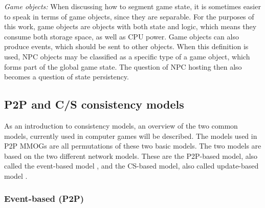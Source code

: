 \documentclass[10pt,a4paper,journal,cspaper,compsoc]{IEEEtran}
\begin{document}
\emph{Game objects:} When discussing how to segment game state, it is sometimes easier to speak in terms of game objects, since they are
    separable. For the purposes of this work, game objects are objects with both state and logic, which means they consume both storage
    space, as well as CPU power. Game objects can also produce events, which should be sent to other objects. When this definition is used,
    NPC objects may be classified as a specific type of a game object, which forms part of the global game state. The question of NPC hosting
    then also becomes a question of state persistency.



\subsection{P2P and C/S consistency models}
\label{p2p_cs_models}

As an introduction to consistency models, an overview of the two common models, currently used in computer games will be described. The models used
in P2P MMOGs are all permutations of these two basic models. The two models are based on the two different network models. These are the P2P-based
model, also called the event-based model \cite{p2p_cm_aoe}, and the \ac{CS}-based model, also called update-based model \cite{unreal_networking}.

\subsubsection{Event-based (P2P)}
\label{classic_cs_event_based}
\end{document}
